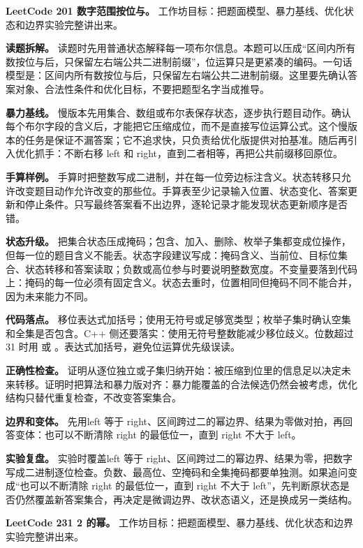 \noindent\textbf{LeetCode 201 数字范围按位与。} 工作坊目标：把题面模型、暴力基线、优化状态和边界实验完整讲出来。

\textbf{读题拆解。} 读题时先用普通状态解释每一项布尔信息。本题可以压成“区间内所有数按位与后，只保留左右端公共二进制前缀”，位运算只是更紧凑的编码。一句话模型是：区间内所有数按位与后，只保留左右端公共二进制前缀。这里要先确认答案对象、合法性条件和优化目标，不要把题型名字当成推导。

\textbf{暴力基线。} 慢版本先用集合、数组或布尔表保存状态，逐步执行题目动作。确认每个布尔字段的含义后，才能把它压缩成位，而不是直接写位运算公式。这个慢版本的任务是保证不漏答案；它不追求快，只负责给优化版提供对拍基准。随后再引入优化抓手：不断右移 left 和 right，直到二者相等，再把公共前缀移回原位。

\textbf{手算样例。} 手算时把整数写成二进制，并在每一位旁边标注含义。状态转移只允许改变题目动作允许改变的那些位。手算表至少记录输入位置、状态变化、答案更新和停止条件。只写最终答案看不出边界，逐轮记录才能发现状态更新顺序是否错。

\textbf{状态升级。} 把集合状态压成掩码；包含、加入、删除、枚举子集都变成位操作，但每一位的题目含义不能丢。状态字段建议写成：掩码含义、当前位、目标位集合、状态转移和答案读取；负数或高位参与时要说明整数宽度。不变量要落到代码上：掩码的每一位必须有固定含义。状态去重时，位置相同但掩码不同不能合并，因为未来能力不同。

\textbf{代码落点。} 移位表达式加括号；使用无符号或足够宽类型；枚举子集时确认空集和全集是否包含。C++ 侧还要落实：使用无符号整数能减少移位歧义。位数超过 31 时用  或 。表达式加括号，避免位运算优先级误读。

\textbf{正确性检查。} 证明从逐位独立或子集归纳开始：被压缩到位里的信息足以决定未来转移。证明时把算法和暴力版对齐：暴力能覆盖的合法候选仍然会被考虑，优化结构只替代重复检查，不改变答案集合。

\textbf{边界和变体。} 先用left 等于 right、区间跨过二的幂边界、结果为零做对拍，再回答变体：也可以不断清除 right 的最低位一，直到 right 不大于 left。

\textbf{实验复盘。} 实验时覆盖left 等于 right、区间跨过二的幂边界、结果为零，把数字写成二进制逐位检查。负数、最高位、空掩码和全集掩码都要单独测。如果追问变成“也可以不断清除 right 的最低位一，直到 right 不大于 left”，先判断原状态是否仍然覆盖新答案集合，再决定是微调边界、改状态语义，还是换成另一类结构。

\noindent\textbf{LeetCode 231 2 的幂。} 工作坊目标：把题面模型、暴力基线、优化状态和边界实验完整讲出来。

